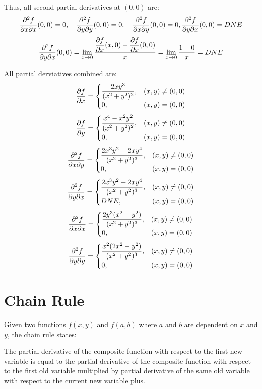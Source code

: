 Thus, all second partial derivatives at \( (0, 0) \) are:
\[
    \dfrac{\partial^2 f}{\partial x \partial x}(0, 0) = 0, \quad \dfrac{\partial^2 f}{\partial y \partial y}(0, 0) = 0, \quad \dfrac{\partial^2 f}{\partial x \partial y}(0, 0) = 0, \dfrac{\partial^2 f}{\partial y \partial x}(0, 0) = DNE
\]
\[
    \dfrac{\partial^2 f}{\partial y \partial x}(0, 0) = 
    \lim_{x\to 0} \dfrac{\dfrac{\partial f}{\partial x}(x, 0) - \dfrac{\partial f}{\partial x}(0, 0)}{x} = \lim_{x\to 0} \dfrac{1 - 0}{x} = DNE
\]

All partial derviatives combined are:
\[
    \dfrac{\partial f}{\partial x} = 
    \begin{cases}
        \dfrac{2xy^3}{(x^2 + y^2)^2}, & (x, y) \neq (0, 0)\\
        0, & (x, y) = (0, 0)
    \end{cases}
\]
\[
    \dfrac{\partial f}{\partial y} = 
    \begin{cases}
        \dfrac{x^4 - x^2 y^2}{(x^2 + y^2)^2}, & (x, y) \neq (0, 0)\\
        0, & (x, y) = (0, 0)
    \end{cases}
\]
\[
    \dfrac{\partial^2 f}{\partial x \partial y} = 
    \begin{cases}
        \dfrac{2x^3 y^2 - 2x y^4}{(x^2 + y^2)^3}, & (x, y) \neq (0, 0)\\
        0, & (x, y) = (0, 0)
    \end{cases}
\]
\[
    \dfrac{\partial^2 f}{\partial y \partial x} = 
    \begin{cases}
        \dfrac{2x^3 y^2 - 2x y^4}{(x^2 + y^2)^3}, & (x, y) \neq (0, 0)\\
        DNE, & (x, y) = (0, 0)
    \end{cases}
\]
\[
    \dfrac{\partial^2 f}{\partial x \partial x} = 
    \begin{cases}
        \dfrac{2y^3(x^2 - y^2)}{(x^2 + y^2)^3}, & (x, y) \neq (0, 0)\\
        0, & (x, y) = (0, 0)
    \end{cases}
\]
\[
    \dfrac{\partial^2 f}{\partial y \partial y} = 
    \begin{cases}
        \dfrac{x^2(2x^2 - y^2)}{(x^2 + y^2)^3}, & (x, y) \neq (0, 0)\\
        0, & (x, y) = (0, 0)
    \end{cases}
\]

\section{Chain Rule}

Given two functions \(f(x, y)\) and \(f(a, b)\) where $a$ and $b$ are dependent on $x$ and $y$, the chain rule states:

The partial derivative of the composite function with respect to the first new variable is equal to the partial derivative of the composite function with respect to the first old variable multiplied by partial derivative of the same old variable with respect to the current new variable plus.


